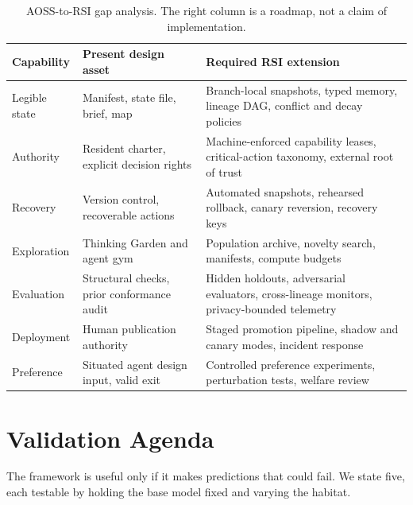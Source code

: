 \documentclass[11pt,a4paper]{article}
\begin{document}
\begin{table}[t]
\centering\small
\caption{AOSS-to-RSI gap analysis. The right column is a roadmap, not a claim of implementation.}
\label{tab:gap}
\begin{tabularx}{\textwidth}{>{\raggedright\arraybackslash}p{2.2cm} >{\raggedright\arraybackslash}p{4.4cm} >{\raggedright\arraybackslash}X}
\toprule
\textbf{Capability} & \textbf{Present design asset} & \textbf{Required RSI extension}\\
\midrule
Legible state & Manifest, state file, brief, map & Branch-local snapshots, typed memory, lineage DAG, conflict and decay policies\\
Authority & Resident charter, explicit decision rights & Machine-enforced capability leases, critical-action taxonomy, external root of trust\\
Recovery & Version control, recoverable actions & Automated snapshots, rehearsed rollback, canary reversion, recovery keys\\
Exploration & Thinking Garden and agent gym & Population archive, novelty search, manifests, compute budgets\\
Evaluation & Structural checks, prior conformance audit & Hidden holdouts, adversarial evaluators, cross-lineage monitors, privacy-bounded telemetry\\
Deployment & Human publication authority & Staged promotion pipeline, shadow and canary modes, incident response\\
Preference & Situated agent design input, valid exit & Controlled preference experiments, perturbation tests, welfare review\\
\bottomrule
\end{tabularx}
\end{table}

\section{Validation Agenda}\label{sec:validation}

The framework is useful only if it makes predictions that could fail. We state five, each testable by holding the base model fixed and varying the habitat.
\end{document}
